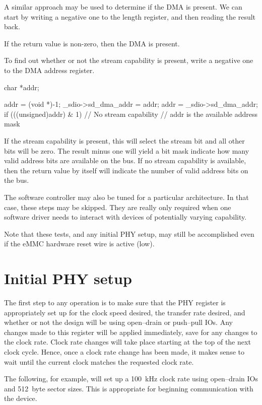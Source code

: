 \documentclass{gqtekspec}
\begin{document}
A similar approach may be used to determine if the DMA is present.  We can
start by writing a negative one to the length register, and then reading
the result back.
\begin{zCpp}
	unsigned	ln;
	char		*addr;

	_sdio->sd_dma_length = -1;
	ln = _sdio->sd_dma_length;
	if (ln != 0) { // DMA is present
\end{zCpp}
If the return value is non-zero, then the DMA is present.

To find out whether or not the stream capability is present, write a negative
one to the DMA address register.
\begin{zCpp}
	char		*addr;

	addr = (void *)-1;
	_sdio->sd_dma_addr = addr;
	addr = _sdio->sd_dma_addr;
	if (((unsigned)addr) & 1) {
		// No stream capability
		// addr is the available address mask
	}
\end{zCpp}
If the stream capability is present, this will select the stream bit
and all other bits will be zero.  The result minus one will yield a bit
mask indicate how many valid address bits are available on the bus.  If
no stream capability is available, then the return value by itself
will indicate the number of valid address bits on the bus.

The software controller may also be tuned for a particular architecture.
In that case, these steps may be skipped.  They are really only required
when one software driver needs to interact with devices of potentially
varying capability.

Note that these tests, and any initial PHY setup, may still be accomplished
even if the eMMC hardware reset wire is active (low).
\section{Initial PHY setup}
The first step to any operation is to make sure that the PHY register
is appropriately set up for the clock speed desired, the transfer rate
desired, and whether or not the design will be using open--drain or push--pull
IOs.  Any changes made to this register will be applied immediately, save
for any changes to the clock rate.  Clock rate changes will take place starting
at the top of the next clock cycle.  Hence, once a clock rate change has been
made, it makes sense to wait until the current clock matches the requested
clock rate.

The following, for example, will set up a 100~kHz clock rate using open--drain
IOs and 512~byte sector sizes.  This is appropriate for beginning communication
with the device.
\end{document}
